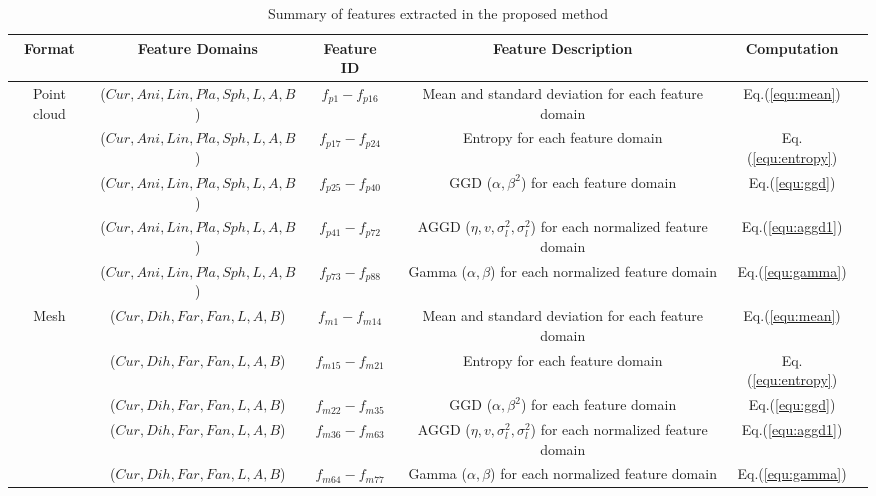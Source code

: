 \documentclass[lettersize,journal]{IEEEtran}
\begin{document}
\begin{table*}[t]
\renewcommand\arraystretch{1.5}
\renewcommand\tabcolsep{3.0pt}
\setlength{\abovecaptionskip}{-5pt}
  \caption{Summary of features extracted in the proposed method}
  
  \label{tab:features}
  \begin{center}
  \begin{tabular}{cccccc}
    \toprule
    Format & Feature Domains & Feature ID & Feature Description  &  Computation\\
    \hline
    \multirow{4}{*}{Point cloud} 
    & ($Cur, Ani, Lin, Pla, Sph,L,A,B$) & $f_{p1}-f_{p16}$      & Mean and standard deviation for each feature domain    &  Eq.(\ref{equ:mean})  \\
    \cline{2-5}
    & ($Cur, Ani, Lin, Pla, Sph,L,A,B$) & $f_{p17}-f_{p24}$  & Entropy for each feature domain  &  Eq.(\ref{equ:entropy})    \\
    \cline{2-5}
    & ($Cur, Ani, Lin, Pla, Sph,L,A,B$) & $f_{p25}-f_{p40}$  &GGD ($\alpha,\beta^2$) for each feature domain  &  Eq.(\ref{equ:ggd})    \\
    \cline{2-5}
     & ($Cur, Ani, Lin, Pla, Sph,L,A,B$) & $f_{p41}-f_{p72}$  & AGGD ($\eta, v,\sigma_{l}^{2},\sigma_{l}^{2}$) for each normalized feature domain  &  Eq.(\ref{equ:aggd1})    \\
     \cline{2-5}
     & ($Cur, Ani, Lin, Pla, Sph,L,A,B$) & $f_{p73}-f_{p88}$  & Gamma ($\alpha,\beta$) for each normalized feature domain  &  Eq.(\ref{equ:gamma})    \\
     \hline
     
    \multirow{4}{*}{Mesh} 
    & ($Cur, Dih, Far, Fan, L, A, B$) & $f_{m1}-f_{m14}$      & Mean and standard deviation for each feature domain    &  Eq.(\ref{equ:mean})  \\
    \cline{2-5}
    & ($Cur, Dih, Far, Fan, L, A, B$) & $f_{m15}-f_{m21}$  & Entropy for each feature domain  &   Eq.(\ref{equ:entropy})    \\
    \cline{2-5}
    & ($Cur, Dih, Far, Fan, L, A, B$) & $f_{m22}-f_{m35}$  &GGD ($\alpha,\beta^2$) for each feature domain  &  Eq.(\ref{equ:ggd})    \\
    \cline{2-5}
     & ($Cur, Dih, Far, Fan, L, A, B$) & $f_{m36}-f_{m63}$  & AGGD ($\eta, v,\sigma_{l}^{2},\sigma_{l}^{2}$) for each normalized feature domain  &   Eq.(\ref{equ:aggd1})    \\
     \cline{2-5}
     & ($Cur, Dih, Far, Fan, L, A, B$) & $f_{m64}-f_{m77}$  & Gamma ($\alpha,\beta$) for each normalized feature domain  & Eq.(\ref{equ:gamma})    \\
    \bottomrule
  \end{tabular}
  \end{center}
\end{table*}
\end{document}
